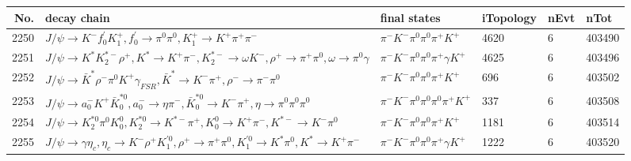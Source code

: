 \begin{table}[htbp] 
\begin{center}
\begin{small}
\begin{tabular}{rlllll}\hline\hline
 No. & decay chain & final states &  iTopology & nEvt & nTot \\\hline
2250&$J/\psi       \rightarrow K^{-}          f^{'}_{0}     K_1^{+}        , f^{'}_{0}      \rightarrow \pi^{0}        \pi^{0}        , K_1^{+}         \rightarrow K^{+}          \pi^{+}        \pi^{-}        $&$\pi^{-}        K^{-}          \pi^{0}        \pi^{0}        \pi^{+}        K^{+}          $& 4620&    6&403490\\
2251&$J/\psi       \rightarrow K^{*}          K_2^{*-}       \rho^{+}      , K^{*}           \rightarrow K^{+}          \pi^{-}        , K_2^{*-}        \rightarrow \omega         K^{-}          , \rho^{+}       \rightarrow \pi^{+}        \pi^{0}        , \omega          \rightarrow \pi^{0}        \gamma       $&$\pi^{-}        K^{-}          \pi^{0}        \pi^{0}        \pi^{+}        \gamma       K^{+}          $& 4625&    6&403496\\
2252&$J/\psi       \rightarrow \bar{K}^{*}   \rho^{-}      \pi^{0}        K^{+}          \gamma_{FSR} , \bar{K}^{*}    \rightarrow K^{-}          \pi^{+}        , \rho^{-}       \rightarrow \pi^{-}        \pi^{0}        $&$\pi^{-}        K^{-}          \pi^{0}        \pi^{0}        \pi^{+}        K^{+}          $&  696&    6&403502\\
2253&$J/\psi       \rightarrow a_{0}^{-}      K^{+}          \bar{K}_0^{*0}, a_{0}^{-}       \rightarrow \eta          \pi^{-}        , \bar{K}_0^{*0} \rightarrow K^{-}          \pi^{+}        , \eta           \rightarrow \pi^{0}        \pi^{0}        \pi^{0}        $&$\pi^{-}        K^{-}          \pi^{0}        \pi^{0}        \pi^{0}        \pi^{+}        K^{+}          $&  337&    6&403508\\
2254&$J/\psi       \rightarrow K_2^{*0}       \pi^{0}        K_0^{0}        , K_2^{*0}        \rightarrow K^{*-}         \pi^{+}        , K_0^{0}         \rightarrow K^{+}          \pi^{-}        , K^{*-}          \rightarrow K^{-}          \pi^{0}        $&$\pi^{-}        K^{-}          \pi^{0}        \pi^{0}        \pi^{+}        K^{+}          $& 1181&    6&403514\\
2255&$J/\psi       \rightarrow \gamma       \eta_{c}    , \eta_{c}     \rightarrow K^{-}          \rho^{+}      K_1^{'0}      , \rho^{+}       \rightarrow \pi^{+}        \pi^{0}        , K_1^{'0}       \rightarrow K^{*}          \pi^{0}        , K^{*}           \rightarrow K^{+}          \pi^{-}        $&$\pi^{-}        K^{-}          \pi^{0}        \pi^{0}        \pi^{+}        \gamma       K^{+}          $& 1222&    6&403520\\

\end{tabular}
\end{small}
\end{center}
\end{table}
